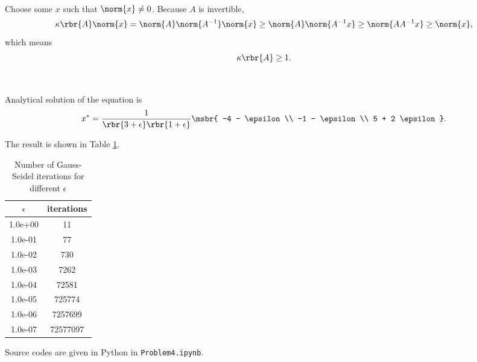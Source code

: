 \documentclass[english, nochinese]{../textmpls/pkupaper}
\begin{document}
\begin{thmquestion}
\ 
\begin{thmproof}
Choose some $x$ such that $ \norm{x} \neq 0 $. Because $A$ is invertible,
\begin{equation}
\kappa \rbr{A} \norm{x} = \norm{A} \norm{A^{-1}} \norm{x} \ge \norm{A} \norm{ A^{-1} x } \ge \norm{ A A^{-1} x } \ge \norm{x},
\end{equation}
which means
\begin{equation}
\kappa \rbr{A} \ge 1.
\end{equation}

\sqed
\end{thmproof}
\end{thmquestion}

\begin{thmquestion}
\ 
\begin{thmanswer}
Analytical solution of the equation is
\begin{equation}
x^{\ast} = \frac{1}{ \rbr{ 3 + \epsilon } \rbr{ 1 + \epsilon } } \msbr{ -4 - \epsilon \\ -1 - \epsilon \\ 5 + 2 \epsilon }.
\end{equation}

The result is shown in Table \ref{Tbl:GSIt}.

\begin{table}[htbp]
\caption{Number of Gauss-Seidel iterations for different $\epsilon$} \label{Tbl:GSIt}
\centering
\begin{tabular}{|c|c|}
\hline
$\epsilon$ & iterations \\
\hline
1.0e+00 & 11 \\
\hline
1.0e-01 & 77 \\
\hline
1.0e-02 & 730 \\
\hline
1.0e-03 & 7262 \\
\hline
1.0e-04 & 72581 \\
\hline
1.0e-05 & 725774 \\
\hline
1.0e-06 & 7257699 \\
\hline
1.0e-07 & 72577097 \\
\hline
\end{tabular}
\end{table}

Source codes are given in Python in \verb"Problem4.ipynb".
\end{thmanswer}
\end{thmquestion}
\end{document}

